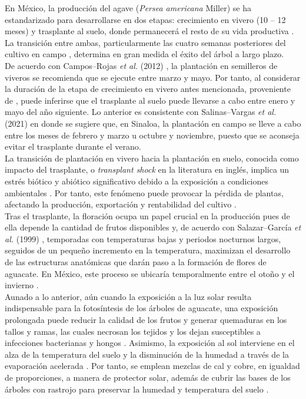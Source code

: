  En México, la producción del agave (\textit{Persea americana} Miller) se ha estandarizado para desarrollarse en dos etapas: crecimiento en vivero (10 -- 12 meses) y trasplante al suelo, donde permanecerá el resto de su vida productiva \cite{SAGARPA_2017}. La transición entre ambas, particularmente las cuatro semanas posteriores del cultivo en campo \cite{Premkumar_2002}, determina en gran medida el éxito del árbol a largo plazo.\\

De acuerdo con Campos--Rojas \textit{et al.} (2012) \cite{Campos-Rojas_2012}, la plantación en semilleros de viveros se recomienda que se ejecute entre marzo y mayo. Por tanto, al considerar la duración de la etapa de crecimiento en vivero antes mencionada, proveniente de \cite{SAGARPA_2017}, puede inferirse que el trasplante al suelo puede llevarse a cabo entre enero y mayo del año siguiente. Lo anterior es consistente con Salinas--Vargas \textit{et al.} (2021) \cite{CODESIN_2021} en donde se sugiere que, en Sinaloa, la plantación en campo se lleve a cabo entre los meses de febrero y marzo u octubre y noviembre, puesto que se aconseja evitar el trasplante durante el verano.\\


La transición de plantación en vivero hacia la plantación en suelo, conocida como impacto del trasplante, o \textit{transplant shock} en la literatura en inglés, implica un estrés biótico y abiótico significativo debido a la exposición a condiciones ambientales \cite{Close_2005, Mainhart_2024}. Por tanto, este fenómeno puede provocar la pérdida de plantas, afectando la producción, exportación y rentabilidad del cultivo \cite{Roka_2010}.\\

Tras el trasplante, la floración ocupa un papel crucial en la producción pues de ella depende la cantidad de frutos disponibles y, de acuerdo con Salazar--García \textit{et al.} (1999) \cite{Salazar_1999}, temporadas con temperaturas bajas y periodos nocturnos largos, seguidos de un pequeño incremento en la temperatura,  maximizan el desarrollo de las estructuras anatómicas que darán paso a la formación de flores de aguacate. En México, este proceso se ubicaría temporalmente entre el otoño y el invierno \cite{Acosta-Rangel_2021}.\\

Aunado a lo anterior, aún cuando la exposición a la luz solar resulta indispensable para la fotosíntesis de los árboles de aguacate, una exposición prolongada puede reducir la calidad de los frutos y generar quemaduras en los tallos y ramas, las cuales necrosan los tejidos y los dejan susceptibles a infecciones bacterianas y hongos \cite{Fischer_2022}. Asimismo, la exposición al sol interviene en el alza de la temperatura del suelo y la disminución de la humedad a través de la evaporación acelerada \cite{Haskell_2012}. Por tanto, se emplean mezclas de cal y cobre, en igualdad de proporciones, a manera de protector solar, además de cubrir las bases de los árboles con rastrojo para preservar la humedad y temperatura del suelo \cite{CODESIN_2021}.\\

